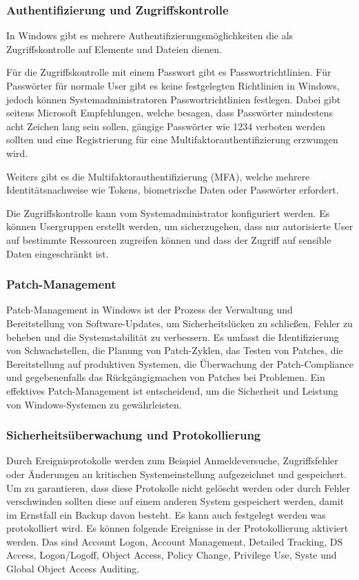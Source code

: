 \subsubsection{Authentifizierung und Zugriffskontrolle}

In Windows gibt es mehrere Authentifizierungsmöglichkeiten die als Zugriffskontrolle auf Elemente und Dateien dienen.

Für die Zugriffskontrolle mit einem Passwort gibt es Passwortrichtlinien. Für Passwörter für normale User gibt es keine festgelegten Richtlinien in Windows, jedoch können Systemadministratoren Passwortrichtlinien festlegen. Dabei gibt seitens Microsoft Empfehlungen, welche besagen, dass Passwörter mindestens acht Zeichen lang sein sollen, gängige Passwörter wie 1234 verboten werden sollten und eine Registrierung für eine Multifaktorauthentifizierung erzwungen wird.

Weiters gibt es die Multifaktorauthentifizierung (MFA), welche mehrere Identitätsnachweise wie Tokens, biometrische Daten oder Passwörter erfordert.

Die Zugriffskontrolle kann vom Systemadministrator konfiguriert werden. Es können Usergruppen erstellt werden, um sicherzugehen, dass nur autorisierte User auf bestimmte Ressourcen zugreifen können und dass der Zugriff auf sensible Daten eingeschränkt ist.

\subsubsection{Patch-Management}

Patch-Management in Windows ist der Prozess der Verwaltung und Bereitstellung von Software-Updates, um Sicherheitslücken zu schließen, Fehler zu beheben und die Systemstabilität zu verbessern. Es umfasst die Identifizierung von Schwachstellen, die Planung von Patch-Zyklen, das Testen von Patches, die Bereitstellung auf produktiven Systemen, die Überwachung der Patch-Compliance und gegebenenfalls das Rückgängigmachen von Patches bei Problemen. Ein effektives Patch-Management ist entscheidend, um die Sicherheit und Leistung von Windows-Systemen zu gewährleisten.

\subsubsection{Sicherheitsüberwachung und Protokollierung}

Durch Ereignisprotokolle werden zum Beispiel Anmeldeversuche, Zugriffsfehler oder Änderungen an kritischen Systemeinstellung aufgezeichnet und gespeichert. Um zu garantieren, dass diese Protokolle nicht gelöscht werden oder durch Fehler verschwinden sollten diese auf einem anderen System gespeichert werden, damit im Ernstfall ein Backup davon besteht. Es kann auch festgelegt werden was protokolliert wird. Es können folgende Ereignisse in der Protokollierung aktiviert werden. Das sind Account Logon, Account Management, Detailed Tracking, DS Access, Logon/Logoff, Object Access, Policy Change, Privilege Use, Syste und Global Object Access Auditing.

